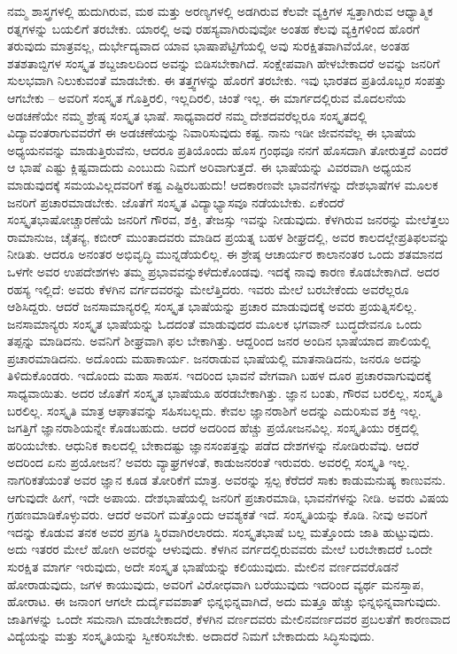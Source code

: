 ನಮ್ಮ ಶಾಸ್ತ್ರಗಳಲ್ಲಿ ಹುದುಗಿರುವ, ಮಠ ಮತ್ತು ಅರಣ್ಯಗಳಲ್ಲಿ ಅಡಗಿರುವ ಕೆಲವೇ ವ್ಯಕ್ತಿಗಳ ಸ್ವತ್ತಾಗಿರುವ ಆಧ್ಯಾತ್ಮಿಕ ರತ್ನಗಳನ್ನು ಬಯಲಿಗೆ ತರಬೇಕು. ಯಾರಲ್ಲಿ ಅವು ರಹಸ್ಯವಾಗಿರುವುವೋ ಅಂತಹ ಕೆಲವು ವ್ಯಕ್ತಿಗಳಿಂದ ಹೊರಗೆ ತರುವುದು ಮಾತ್ರವಲ್ಲ, ದುರ್ಭೇದ್ಯವಾದ ಯಾವ ಭಾಷಾಪೆಟ್ಟಿಗೆಯಲ್ಲಿ ಅವು ಸುರಕ್ಷಿತವಾಗಿವೆಯೋ, ಅಂತಹ ಶತಶತಾಬ್ದಿಗಳ ಸಂಸ್ಕೃತ ಶಬ್ದಜಾಲದಿಂದ ಅವನ್ನು ಬಿಡಿಸಬೇಕಾಗಿದೆ. ಸಂಕ್ಷೇಪವಾಗಿ ಹೇಳಬೇಕಾದರೆ ಅವನ್ನು ಜನರಿಗೆ ಸುಲಭವಾಗಿ ನಿಲುಕುವಂತೆ ಮಾಡಬೇಕು. ಈ ತತ್ತ್ವಗಳನ್ನು ಹೊರಗೆ ತರಬೇಕು. ಇವು ಭಾರತದ ಪ್ರತಿಯೊಬ್ಬರ ಸಂಪತ್ತು ಆಗಬೇಕು – ಅವರಿಗೆ ಸಂಸ್ಕೃತ ಗೊತ್ತಿರಲಿ, ಇಲ್ಲದಿರಲಿ, ಚಿಂತೆ ಇಲ್ಲ. ಈ ಮಾರ್ಗದಲ್ಲಿರುವ ಮೊದಲನೆಯ ಅಡಚಣೆಯೇ ನಮ್ಮ ಶ್ರೇಷ್ಠ ಸಂಸ್ಕೃತ ಭಾಷೆ. ಸಾಧ್ಯವಾದರೆ ನಮ್ಮ ದೇಶದವರೆಲ್ಲರೂ ಸಂಸ್ಕೃತದಲ್ಲಿ ವಿದ್ಯಾವಂತರಾಗುವವರೆಗೆ ಈ ಅಡಚಣೆಯನ್ನು ನಿವಾರಿಸುವುದು ಕಷ್ಟ. ನಾನು ಇಡೀ ಜೀವನವೆಲ್ಲ ಈ ಭಾಷೆಯ ಅಧ್ಯಯನವನ್ನು ಮಾಡುತ್ತಿರುವೆನು, ಆದರೂ ಪ್ರತಿಯೊಂದು ಹೊಸ ಗ್ರಂಥವೂ ನನಗೆ ಹೊಸದಾಗಿ ತೋರುತ್ತದೆ ಎಂದರೆ ಆ ಭಾಷೆ ಎಷ್ಟು ಕ್ಲಿಷ್ಟವಾದುದು ಎಂಬುದು ನಿಮಗೆ ಅರಿವಾಗುತ್ತದೆ. ಈ ಭಾಷೆಯನ್ನು ವಿವರವಾಗಿ ಅಧ್ಯಯನ ಮಾಡುವುದಕ್ಕೆ ಸಮಯವಿಲ್ಲದವರಿಗೆ ಕಷ್ಟ ಎಷ್ಟಿರಬಹುದು! ಆದಕಾರಣವೇ ಭಾವನೆಗಳನ್ನು ದೇಶಭಾಷೆಗಳ ಮೂಲಕ ಜನರಿಗೆ ಪ್ರಚಾರಮಾಡಬೇಕು. ಜೊತೆಗೆ ಸಂಸ್ಕೃತ ವಿದ್ಯಾಭ್ಯಾಸವೂ ನಡೆಯಬೇಕು. ಏಕೆಂದರೆ ಸಂಸ್ಕೃತಭಾಷೋಚ್ಚಾರಣೆಯೆ ಜನರಿಗೆ ಗೌರವ, ಶಕ್ತಿ, ತೇಜಸ್ಸು ಇವನ್ನು ನೀಡುವುದು. ಕೆಳಗಿರುವ ಜನರನ್ನು ಮೇಲೆತ್ತಲು ರಾಮಾನುಜ, ಚೈತನ್ಯ, ಕಬೀರ್​ ಮುಂತಾದವರು ಮಾಡಿದ ಪ್ರಯತ್ನ ಬಹಳ ಶೀಘ್ರದಲ್ಲಿ, ಅವರ ಕಾಲದಲ್ಲೇ\break ಪ್ರತಿಫಲವನ್ನು ನೀಡಿತು. ಆದರೂ ಅನಂತರ ಅಭಿವೃದ್ಧಿ ಮುನ್ನಡೆಯಲಿಲ್ಲ. ಈ ಶ್ರೇಷ್ಠ ಆಚಾರ್ಯರ ಕಾಲಾನಂತರ ಒಂದು ಶತಮಾನದ ಒಳಗೇ ಅವರ ಉಪದೇಶಗಳು ತಮ್ಮ ಪ್ರಭಾವವನ್ನುಕಳೆದುಕೊಂಡವು. ಇದಕ್ಕೆ ನಾವು ಕಾರಣ ಕೊಡಬೇಕಾಗಿದೆ. ಅದರ ರಹಸ್ಯ ಇಲ್ಲಿದೆ: ಅವರು ಕೆಳಗಿನ ವರ್ಗದವರನ್ನು ಮೇಲೆತ್ತಿದರು. ಇವರು ಮೇಲೆ ಬರಬೇಕೆಂದು ಅವರೆಲ್ಲರೂ ಆಶಿಸಿದ್ದರು. ಆದರೆ ಜನಸಾಮಾನ್ಯರಲ್ಲಿ ಸಂಸ್ಕೃತ ಭಾಷೆಯನ್ನು ಪ್ರಚಾರ ಮಾಡುವುದಕ್ಕೆ ಅವರು ಪ್ರಯತ್ನಿಸಲಿಲ್ಲ. ಜನಸಾಮಾನ್ಯರು ಸಂಸ್ಕೃತ ಭಾಷೆಯನ್ನು ಓದದಂತೆ ಮಾಡುವುದರ ಮೂಲಕ ಭಗವಾನ್​ ಬುದ್ಧದೇವನೂ ಒಂದು ತಪ್ಪನ್ನು ಮಾಡಿದನು. ಅವನಿಗೆ ಶೀಘ್ರವಾಗಿ ಫಲ ಬೇಕಾಗಿತ್ತು. ಆದ್ದರಿಂದ ಜನರ ಅಂದಿನ ಭಾಷೆಯಾದ ಪಾಲಿಯಲ್ಲಿ ಪ್ರಚಾರಮಾಡಿದನು. ಅದೊಂದು ಮಹಾಕಾರ್ಯ. ಜನರಾಡುವ ಭಾಷೆಯಲ್ಲಿ ಮಾತನಾಡಿದನು, ಜನರೂ ಅದನ್ನು ತಿಳಿದುಕೊಂಡರು. ಇದೊಂದು ಮಹಾ ಸಾಹಸ. ಇದರಿಂದ ಭಾವನೆ ವೇಗವಾಗಿ ಬಹಳ ದೂರ ಪ್ರಚಾರವಾಗುವುದಕ್ಕೆ ಸಾಧ್ಯವಾಯಿತು. ಅದರ ಜೊತೆಗೆ ಸಂಸ್ಕೃತ ಭಾಷೆಯೂ ಹರಡಬೇಕಾಗಿತ್ತು. ಜ್ಞಾನ ಬಂತು, ಗೌರವ ಬರಲಿಲ್ಲ, ಸಂಸ್ಕೃತಿ ಬರಲಿಲ್ಲ. ಸಂಸ್ಕೃತಿ ಮಾತ್ರ ಆಘಾತವನ್ನು ಸಹಿಸಬಲ್ಲದು. ಕೇವಲ ಜ್ಞಾನರಾಶಿಗೆ ಅದನ್ನು ಎದುರಿಸುವ ಶಕ್ತಿ ಇಲ್ಲ. ಜಗತ್ತಿಗೆ ಜ್ಞಾನರಾಶಿಯನ್ನೇ ಕೊಡಬಹುದು. ಆದರೆ ಅದರಿಂದ ಹೆಚ್ಚು ಪ್ರಯೋಜನವಿಲ್ಲ. ಸಂಸ್ಕೃತಿಯು ರಕ್ತದಲ್ಲಿ ಹರಿಯಬೇಕು. ಆಧುನಿಕ ಕಾಲದಲ್ಲಿ ಬೇಕಾದಷ್ಟು ಜ್ಞಾನಸಂಪತ್ತನ್ನು ಪಡೆದ ದೇಶಗಳನ್ನು ನೋಡಿರುವೆವು. ಆದರೆ ಅದರಿಂದ ಏನು ಪ್ರಯೋಜನ? ಅವರು ವ್ಯಾಘ್ರಗಳಂತೆ, ಕಾಡುಜನರಂತೆ ಇರುವರು. ಅವರಲ್ಲಿ ಸಂಸ್ಕೃತಿ ಇಲ್ಲ. ನಾಗರಿಕತೆಯಂತೆ ಅವರ ಜ್ಞಾನ ಕೂಡ ತೋರಿಕೆಗೆ ಮಾತ್ರ. ಅವರನ್ನು ಸ್ಪಲ್ಪ ಕೆರೆದರೆ ಸಾಕು ಕಾಡುಮನುಷ್ಯ ಕಾಣುವನು. ಆಗುವುದೇ ಹೀಗೆ, ಇದೇ ಅಪಾಯ. ದೇಶಭಾಷೆಯಲ್ಲಿ ಜನರಿಗೆ ಪ್ರಚಾರಮಾಡಿ, ಭಾವನೆಗಳನ್ನು ನೀಡಿ. ಅವರು ವಿಷಯ ಗ್ರಹಣಮಾಡಿಕೊಳ್ಳುವರು. ಆದರೆ ಅವರಿಗೆ ಮತ್ತೊಂದು ಆವಶ್ಯಕತೆ ಇದೆ. ಸಂಸ್ಕೃತಿಯನ್ನು ಕೊಡಿ. ನೀವು ಅವರಿಗೆ ಇದನ್ನು ಕೊಡುವ ತನಕ ಅವರ ಪ್ರಗತಿ ಸ್ಥಿರವಾಗಿರಲಾರದು. ಸಂಸ್ಕೃತಭಾಷೆ ಬಲ್ಲ ಮತ್ತೊಂದು ಜಾತಿ ಹುಟ್ಟುವುದು. ಅದು ಇತರರ ಮೇಲೆ ಹೋಗಿ ಅವರನ್ನು ಆಳುವುದು. ಕೆಳಗಿನ ವರ್ಗದಲ್ಲಿರುವವರು ಮೇಲೆ ಬರಬೇಕಾದರೆ ಒಂದೇ ಸುರಕ್ಷಿತ ಮಾರ್ಗ ಇರುವುದು, ಅದೇ ಸಂಸ್ಕೃತ ಭಾಷೆಯನ್ನು ಕಲಿಯುವುದು. ಮೇಲಿನ ವರ್ಣದವರೊಡನೆ ಹೋರಾಡುವುದು, ಜಗಳ ಕಾಯುವುದು, ಅವರಿಗೆ ವಿರೋಧವಾಗಿ ಬರೆಯುವುದು ಇದರಿಂದ ವ್ಯರ್ಥ ಮನಸ್ತಾಪ, ಹೋರಾಟ. ಈ ಜನಾಂಗ ಆಗಲೇ ದುರ್ದೈವವಶಾತ್​ ಭಿನ್ನಭಿನ್ನವಾಗಿದೆ, ಅದು ಮತ್ತೂ ಹೆಚ್ಚು ಭಿನ್ನಭಿನ್ನವಾಗುವುದು. ಜಾತಿಗಳನ್ನು ಒಂದೇ ಸಮನಾಗಿ ಮಾಡಬೇಕಾದರೆ, ಕೆಳಗಿನ ವರ್ಣದವರು ಮೇಲಿನವರ್ಣದವರ ಪ್ರಬಲತೆಗೆ ಕಾರಣವಾದ ವಿದ್ಯೆಯನ್ನು ಮತ್ತು ಸಂಸ್ಕೃತಿಯನ್ನು ಸ್ವೀಕರಿಸಬೇಕು. ಅದಾದರೆ ನಿಮಗೆ ಬೇಕಾದುದು ಸಿದ್ಧಿಸುವುದು.

